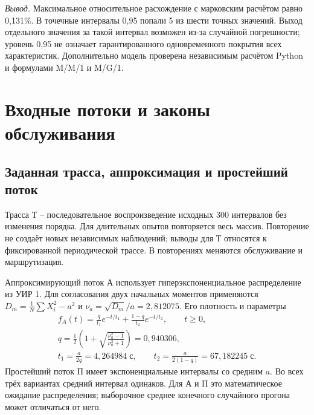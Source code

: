 \documentclass[12pt,a4paper]{article}
\newcommand{\concl}[1]{\par\noindent\textit{Вывод.} #1\par}
\begin{document}
\begin{center}\small\renewcommand{\arraystretch}{1.3}
\end{center}

\concl{Максимальное относительное расхождение с марковским расчётом равно 0,131\%. В точечные интервалы 0,95 попали 5 из шести точных значений. Выход отдельного значения за такой интервал возможен из-за случайной погрешности; уровень 0,95 не означает гарантированного одновременного покрытия всех характеристик. Дополнительно модель проверена независимым расчётом Python и формулами M/M/1 и M/G/1.}

\section{Входные потоки и законы обслуживания}
\subsection{Заданная трасса, аппроксимация и простейший поток}
Трасса Т -- последовательное воспроизведение исходных 300 интервалов без изменения порядка. Для длительных опытов повторяется весь массив. Повторение не создаёт новых независимых наблюдений; выводы для Т относятся к фиксированной периодической трассе. В повторениях меняются обслуживание и маршрутизация.

Аппроксимирующий поток А использует гиперэкспоненциальное распределение из УИР 1. Для согласования двух начальных моментов применяются \(D_m=\frac1N\sum X_i^2-a^2\) и \(\nu_a=\sqrt{D_m}/a=2{,}812075\). Его плотность и параметры
\begin{gather}
f_A(t)=\frac q{t_1}e^{-t/t_1}+\frac{1-q}{t_2}e^{-t/t_2},\qquad t\geq0,\\
q=\frac12\left(1+\sqrt{\frac{\nu_a^2-1}{\nu_a^2+1}}\right)=0{,}940306,\\
t_1=\frac a{2q}=4{,}264984\;\text{с},\qquad
t_2=\frac a{2(1-q)}=67{,}182245\;\text{с}.
\end{gather}
Простейший поток П имеет экспоненциальные интервалы со средним \(a\). Во всех трёх вариантах средний интервал одинаков. Для А и П это математическое ожидание распределения; выборочное среднее конечного случайного прогона может отличаться от него.
\end{document}
